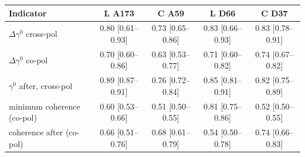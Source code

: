 \begin{tabular}{lcccc}
\toprule
Indicator & L A173 & C A59 & L D66 & C D37 \\
\midrule
$\Delta\gamma^0$ cross-pol & 0.80 {\scriptsize [0.61--0.93]} & 0.73 {\scriptsize [0.65--0.86]} & 0.83 {\scriptsize [0.66--0.93]} & 0.83 {\scriptsize [0.78--0.91]} \\
$\Delta\gamma^0$ co-pol & 0.70 {\scriptsize [0.60--0.86]} & 0.63 {\scriptsize [0.53--0.77]} & 0.71 {\scriptsize [0.60--0.82]} & 0.74 {\scriptsize [0.67--0.82]} \\
$\gamma^0$ after, cross-pol & 0.89 {\scriptsize [0.87--0.91]} & 0.76 {\scriptsize [0.72--0.84]} & 0.85 {\scriptsize [0.81--0.91]} & 0.82 {\scriptsize [0.75--0.89]} \\
minimum coherence (co-pol) & 0.60 {\scriptsize [0.53--0.66]} & 0.51 {\scriptsize [0.50--0.55]} & 0.81 {\scriptsize [0.75--0.86]} & 0.52 {\scriptsize [0.50--0.55]} \\
coherence after (co-pol) & 0.66 {\scriptsize [0.51--0.76]} & 0.68 {\scriptsize [0.61--0.79]} & 0.54 {\scriptsize [0.50--0.78]} & 0.74 {\scriptsize [0.66--0.83]} \\
\bottomrule
\end{tabular}
